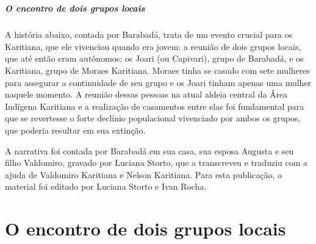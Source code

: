 \chapter*{}
\thispagestyle{empty}

\vspace*{\fill}

\paragraph{O encontro de dois grupos locais}
A história abaixo, contada por Barabadá, trata de um evento crucial para
os Karitiana, que ele vivenciou quando era jovem: a reunião de dois
grupos locais, que até então eram autônomos: os Joari (ou Capivari),
grupo de Barabadá, e os Karitiana, grupo de Moraes Karitiana. Moraes
tinha se casado com sete mulheres para assegurar a continuidade de seu
grupo e os Joari tinham apenas uma mulher naquele momento. A reunião
dessas pessoas na atual aldeia central da Área Indígena Karitiana e a
realização de casamentos entre elas foi fundamental para que se
revertesse o forte declínio populacional vivenciado por ambos os grupos,
que poderia resultar em sua extinção.

A narrativa foi contada por Barabadá em sua casa, sua esposa Augusta e
seu filho Valdomiro, gravado por Luciana Storto, que a transcreveu e
traduziu com a ajuda de Valdomiro Karitiana e Nelson Karitiana. Para
esta publicação, o material foi editado por Luciana Storto e Ivan Rocha.
\vspace*{\fill}


 \chapter{O encontro de dois grupos locais}

